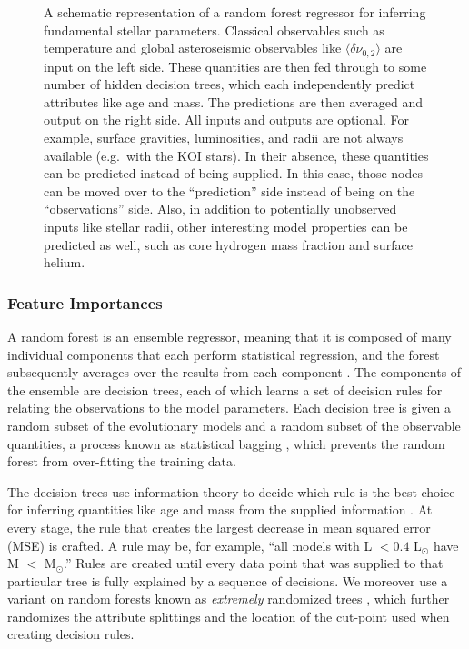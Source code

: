 \documentclass[twocolumn,twocolappendix]{aastex6}
\begin{document}
\begin{figure*}[ht]
    \centering
    
    \caption{A schematic representation of a random forest regressor for inferring fundamental stellar parameters. Classical observables such as temperature and global asteroseismic observables like $\langle\delta\nu_{0,2}\rangle$ are input on the left side. These quantities are then fed through to some number of hidden decision trees, which each independently predict attributes like age and mass. The predictions are then averaged and output on the right side. All inputs and outputs are optional. For example, surface gravities, luminosities, and radii are not always available (e.g.\ with the KOI stars). In their absence, these quantities can be predicted instead of being supplied. In this case, those nodes can be moved over to the ``prediction'' side instead of being on the ``observations'' side. Also, in addition to potentially unobserved inputs like stellar radii, other interesting model properties can be predicted as well, such as core hydrogen mass fraction and surface helium. \label{fig:rf} }
\end{figure*}


\subsubsection{Feature Importances}
\label{sec:importances}
A random forest is an ensemble regressor, meaning that it is composed of many individual components that each perform statistical regression, and the forest subsequently averages over the results from each component \citep{breiman2001random}. The components of the ensemble are decision trees, each of which learns a set of decision rules for relating the observations to the model parameters. Each decision tree is given a random subset of the evolutionary models and a random subset of the observable quantities, a process known as statistical bagging \citep[][Section 8.7]{hastie2005elements}, which prevents the random forest from over-fitting the training data. 

The decision trees use information theory to decide which rule is the best choice for inferring quantities like age and mass from the supplied information \citep[][Chapter 9]{hastie2005elements}. At every stage, the rule that creates the largest decrease in mean squared error (MSE) is crafted. A rule may be, for example, ``all models with L $<0.4$ L$_\odot$ have M $<$ M$_\odot$.'' Rules are created until every data point that was supplied to that particular tree is fully explained by a sequence of decisions. We moreover use a variant on random forests known as \emph{extremely} randomized trees \citep{geurts2006extremely}, which further randomizes the attribute splittings and the location of the cut-point used when creating decision rules. 
\end{document}
